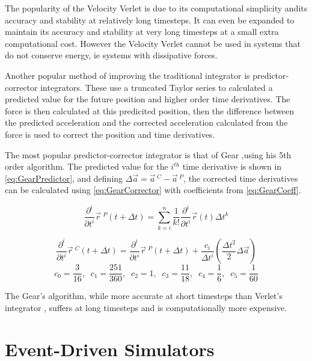 \documentclass[12pt]{UoAthesis}
\begin{document}
The popularity of the Velocity Verlet is due to its computational
simplicity andits accuracy and stability at relatively long
timesteps. It can even be expanded\cite{Khakimov2002} to maintain its
accuracy and stability at very long timesteps at a small extra
computational cost. However the Velocity Verlet cannot be used in
systems that do not conserve energy, ie systems with dissipative
forces.

Another popular method of improving the traditional integrator is
predictor-corrector integrators. These use a truncated Taylor series
to calculated a predicted value for the future position and higher
order time derivatives. The force is then calculated at this
predicited position, then the difference between the predicted
acceleration and the corrected acceleration calculated from the force
is used to correct the position and time derivatives.

The most popular predictor-corrector integrator is that of Gear
\cite{Gear1971},using his 5th order algorithm. The predicted value for
the $i^{th}$ time derivative is shown in \eqref{eq:GearPredictor}, and
defining $\Delta \vec{a} = \vec{a}\,^{C} - \vec{a}\,^{P}$, the
corrected time derivatives can be calculated using
\eqref{eq:GearCorrector} with coefficients from \eqref{eq:GearCoeff}.

\begin{equation} 
  \frac{\partial^{i}}{\partial t^{i}} \vec{r}\:^{P}(t+\Delta t)
  =\sum^{n}_{k=i} \frac{1}{k!}\frac{\partial^{i} }{\partial t^{i}}
  \vec{r}(t) \Delta t^{k} 
  \label{eq:GearPredictor} 
\end{equation}

\begin{equation} 
  \frac{\partial^{i}}{\partial t^{i}} \vec{r}\:^{C}(t+\Delta t)
  =\frac{\partial^{i} }{\partial t^{i}} \vec{r}\:^{P}(t+\Delta t)
  +\frac{c_i}{\Delta t^i} \left(\frac{\Delta t^2}{2}\Delta \vec{a}\right)
  \label{eq:GearCorrector} \end{equation} \begin{equation} c_0 =
  \frac{3}{16},\;\;c_1 = \frac{251}{360},\;\; c_2 = 1,\;\; c_3 =
  \frac{11}{18},\;\; c_4 =
  \frac{1}{6},\;\; c_5 = \frac{1}{60} \label{eq:GearCoeff} 
\end{equation}

The Gear's algorithm, while more accurate at short timesteps than Verlet's
integrator \cite{Haile1997}, suffers at long timesteps and is computationally
more expensive.

\section{Event-Driven Simulators} 
\end{document}
